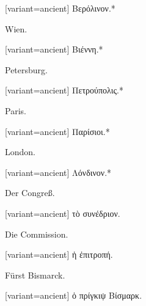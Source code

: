 \switchcolumn

\begin{greek}[variant=ancient]%
Βερόλινον.{*}

\end{greek}%
\switchcolumn*

Wien.

\switchcolumn

\begin{greek}[variant=ancient]%
Βιέννη.{*}

\end{greek}%
\switchcolumn*

Peters\textcompwordmark{}burg. 

\switchcolumn

\begin{greek}[variant=ancient]%
Πετρούπολις.{*}

\end{greek}%
\switchcolumn*

Paris.

\switchcolumn

\begin{greek}[variant=ancient]%
Παρίσιοι.{*}

\end{greek}%
\switchcolumn*

London.

\switchcolumn

\begin{greek}[variant=ancient]%
Λόνδινον.{*}

\end{greek}%
\switchcolumn*

Der Congreß.

\switchcolumn

\begin{greek}[variant=ancient]%
τὸ συνέδριον.

\end{greek}%
\switchcolumn*

Die Commission.

\switchcolumn

\begin{greek}[variant=ancient]%
ἡ ἐπιτροπή.

\end{greek}%
\switchcolumn*

Fürst Bismarck.

\switchcolumn

\begin{greek}[variant=ancient]%
ὁ πρίγκιψ Βίσμαρκ.

\end{greek}%
\switchcolumn*

